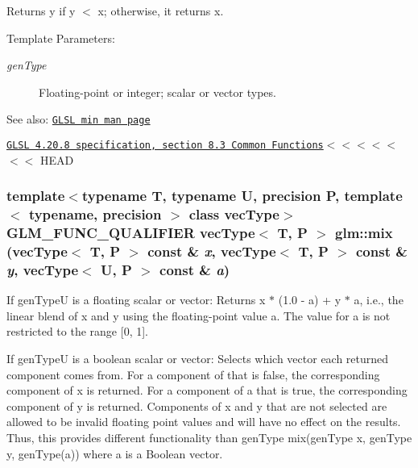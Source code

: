 Returns y if y $<$ x; otherwise, it returns x.

\begin{Desc}
\item[Template Parameters:]
\begin{description}
\item[{\em genType}]Floating-point or integer; scalar or vector types.\end{description}
\end{Desc}
\begin{Desc}
\item[See also:]\href{http://www.opengl.org/sdk/docs/manglsl/xhtml/min.xml}{\tt GLSL min man page} 

\href{http://www.opengl.org/registry/doc/GLSLangSpec.4.20.8.pdf}{\tt GLSL 4.20.8 specification, section 8.3 Common Functions}$<$$<$$<$$<$$<$$<$$<$ HEAD \end{Desc}
\hypertarget{group__core__func__common_gc208863c09fe827a44c976cc6d2aee33}{
\subsubsection[mix]{\setlength{\rightskip}{0pt plus 5cm}template$<$typename T, typename U, precision P, template$<$ typename, precision $>$ class vecType$>$ GLM\_\-FUNC\_\-QUALIFIER vecType$<$ T, P $>$ glm::mix (vecType$<$ T, P $>$ const \& {\em x}, \/  vecType$<$ T, P $>$ const \& {\em y}, \/  vecType$<$ U, P $>$ const \& {\em a})}}
\label{group__core__func__common_gc208863c09fe827a44c976cc6d2aee33}


If genTypeU is a floating scalar or vector: Returns x $\ast$ (1.0 - a) + y $\ast$ a, i.e., the linear blend of x and y using the floating-point value a. The value for a is not restricted to the range \mbox{[}0, 1\mbox{]}.

If genTypeU is a boolean scalar or vector: Selects which vector each returned component comes from. For a component of  that is false, the corresponding component of x is returned. For a component of a that is true, the corresponding component of y is returned. Components of x and y that are not selected are allowed to be invalid floating point values and will have no effect on the results. Thus, this provides different functionality than genType mix(genType x, genType y, genType(a)) where a is a Boolean vector.

